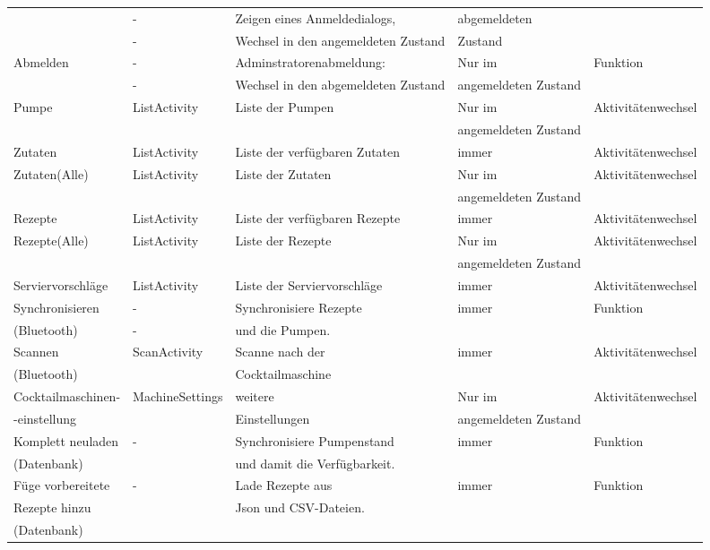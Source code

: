 {\begin{table}
\begin{tabular}{|l|l|l|l|l|}
		  & -  &  Zeigen eines Anmeldedialogs,   & abgemeldeten   &  \\ 
		  & -  &   Wechsel in den angemeldeten Zustand  & Zustand  &  \\ 
		 \hline
		Abmelden  & -  & Adminstratorenabmeldung:  & Nur im    & Funktion \\ 
		  & -  &  Wechsel in den abgemeldeten Zustand  & angemeldeten Zustand  &  \\ 
		  \hline
		Pumpe  & ListActivity  & Liste der Pumpen  & Nur im   & Aktivitätenwechsel \\   &   &  &  angemeldeten Zustand  &  \\ \hline
		Zutaten  & ListActivity  & Liste der verfügbaren Zutaten  & immer  & Aktivitätenwechsel \\ \hline
		Zutaten(Alle)  & ListActivity  & Liste der Zutaten  & Nur im  & Aktivitätenwechsel \\
		   &   &  &  angemeldeten Zustand  &  \\  \hline
		Rezepte  & ListActivity  & Liste der verfügbaren Rezepte  & immer  & Aktivitätenwechsel \\ \hline
		Rezepte(Alle)  & ListActivity  & Liste der Rezepte  & Nur im  & Aktivitätenwechsel \\ 
		   &   &  &  angemeldeten Zustand  &  \\ \hline
		Serviervorschläge  & ListActivity  & Liste der Serviervorschläge  & immer  & Aktivitätenwechsel \\ \hline
		Synchronisieren   & -  & Synchronisiere Rezepte  & immer  & Funktion \\ 
		 (Bluetooth)  & -  & und die Pumpen.  &   &  \\ \hline
		Scannen   & ScanActivity  & Scanne nach der   & immer  & Aktivitätenwechsel \\
		 (Bluetooth)  &   & Cocktailmaschine  &    &   \\ \hline
		Cocktailmaschinen-  & MachineSettings  & weitere   &  Nur im  & Aktivitätenwechsel \\
		-einstellung  &   &  Einstellungen  &   angemeldeten Zustand  &  \\
		 \hline
		Komplett neuladen  & -  & Synchronisiere Pumpenstand  & immer  & Funktion \\
		 (Datenbank)  &   &  und damit die Verfügbarkeit.  &    &  \\  \hline
		Füge vorbereitete  & -  & Lade Rezepte aus   & immer  & Funktion \\
		Rezepte hinzu   &   &Json und CSV-Dateien.  &    &   \\ 
		(Datenbank)  &   &   &    &   \\  \hline
	\end{tabular}
\end{table}

}
